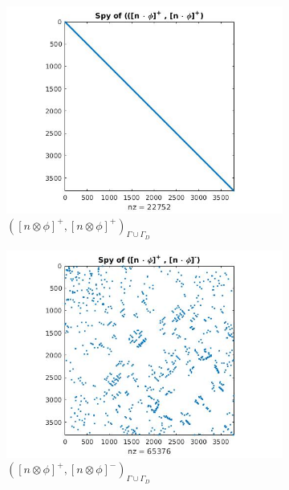 \documentclass[a4paper]{book}
\begin{document}
\begin{figure}[H]
\begin{subfigure}{.5\textwidth}
\centering
  \includegraphics[width=\linewidth]{figure21.jpg}
  \caption{$([n \otimes \phi]^+,[n \otimes \phi]^+)_{\Gamma \cup \Gamma_D}$}
  \label{fig:figure21}
\end{subfigure}
\begin{subfigure}{.5\textwidth}	
\centering
  \includegraphics[width=\linewidth]{figure22.jpg}
  \caption{$([n \otimes \phi]^+,[n \otimes \phi]^-)_{\Gamma \cup \Gamma_D}$}
  \label{fig:figure22}
\end{subfigure}
\begin{subfigure}{.5\textwidth}
\centering

\end{subfigure}
\end{figure}
\end{document}
